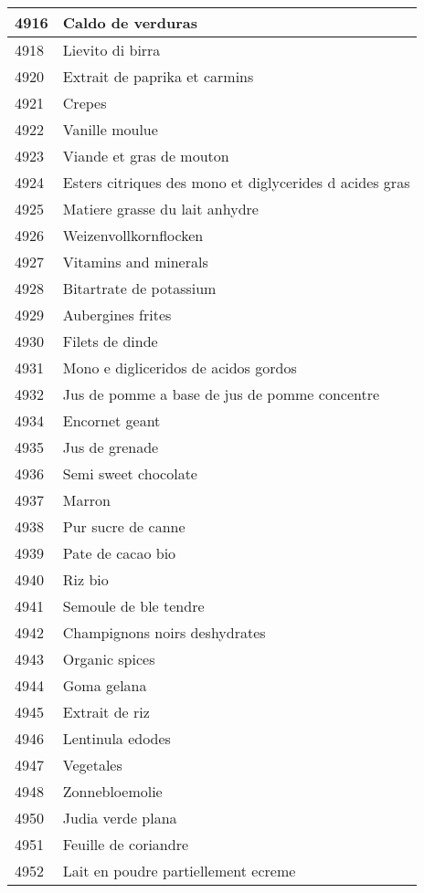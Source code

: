\begin{longtable}{|l|l|}
4916 & Caldo de verduras \\ \hline 
4918 & Lievito di birra \\ \hline 
4920 & Extrait de paprika et carmins \\ \hline 
4921 & Crepes \\ \hline 
4922 & Vanille moulue \\ \hline 
4923 & Viande et gras de mouton \\ \hline 
4924 & Esters citriques des mono et diglycerides d acides gras \\ \hline 
4925 & Matiere grasse du lait anhydre \\ \hline 
4926 & Weizenvollkornflocken \\ \hline 
4927 & Vitamins and minerals \\ \hline 
4928 & Bitartrate de potassium \\ \hline 
4929 & Aubergines frites \\ \hline 
4930 & Filets de dinde \\ \hline 
4931 & Mono e digliceridos de acidos gordos \\ \hline 
4932 & Jus de pomme a base de jus de pomme concentre \\ \hline 
4934 & Encornet geant \\ \hline 
4935 & Jus de grenade \\ \hline 
4936 & Semi sweet chocolate \\ \hline 
4937 & Marron \\ \hline 
4938 & Pur sucre de canne \\ \hline 
4939 & Pate de cacao bio \\ \hline 
4940 & Riz bio \\ \hline 
4941 & Semoule de ble tendre \\ \hline 
4942 & Champignons noirs deshydrates \\ \hline 
4943 & Organic spices \\ \hline 
4944 & Goma gelana \\ \hline 
4945 & Extrait de riz \\ \hline 
4946 & Lentinula edodes \\ \hline 
4947 & Vegetales \\ \hline 
4948 & Zonnebloemolie \\ \hline 
4950 & Judia verde plana \\ \hline 
4951 & Feuille de coriandre \\ \hline 
4952 & Lait en poudre partiellement ecreme \\ \hline 

\end{longtable}
